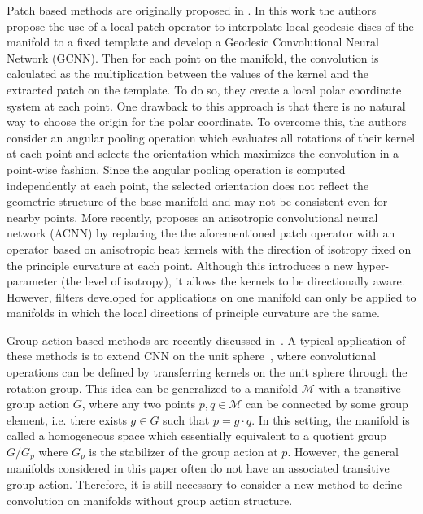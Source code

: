 \documentclass[10pt,twocolumn,letterpaper]{article}
\def\M{\mathcal{M}}
\begin{document}
Patch based methods are originally proposed in \cite{masci2015geodesic}. In this work the authors propose the use of a local patch operator to interpolate local geodesic discs of the manifold to a fixed template and develop a Geodesic Convolutional Neural Network (GCNN). Then for each point on the manifold, the convolution is calculated as the multiplication between the values of the kernel and the extracted patch on the template. To do so, they create a local polar coordinate system at each point. One drawback to this approach is that there is no natural way to choose the origin for the polar coordinate. To overcome this, the authors consider an angular pooling operation which evaluates all rotations of their kernel at each point and selects the orientation which maximizes the convolution in a point-wise fashion. Since the angular pooling operation is computed independently at each point, the selected orientation does not reflect the geometric structure of the base manifold and may not be consistent even for nearby points.
More recently, \cite{boscaini2016learning} proposes an anisotropic convolutional neural network (ACNN) by replacing the the aforementioned patch operator with an operator based on anisotropic heat kernels with the direction of isotropy fixed on the principle curvature at each point. Although this introduces a new hyper-parameter (the level of isotropy), it allows the kernels to be directionally aware. However, 
filters developed for applications on one manifold can only be applied to manifolds in which the local directions of principle curvature are the same. 

Group action based methods are recently discussed in~\cite{kondor2018generalization,cohen2018spherical,chakraborty2018h}. A typical application of these methods is to extend CNN on the unit sphere~\cite{cohen2018spherical}, where convolutional operations can be defined by transferring kernels on the unit sphere through the rotation group. This idea can be generalized to a manifold $\M$ with a transitive group action $G$, where any two points $p, q \in\M$ can be connected by some group element, i.e. there exists $g\in G$ such that $p = g\cdot q$. In this setting, the manifold is called a homogeneous space which essentially equivalent to a quotient group $G/G_p$ where $G_p$ is the stabilizer of the group action at $p$. However, the general manifolds considered in this paper often do not have an associated transitive group action. Therefore, it is still necessary to consider a new method to define convolution on manifolds without group action structure. 
\end{document}
